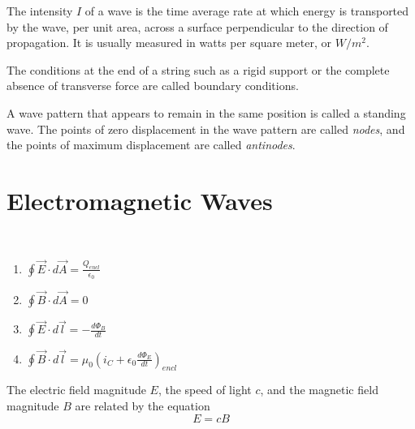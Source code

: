 \documentclass[nobib,notoc]{tufte-handout}
\begin{document}
\begin{defi}[Intensity]
	The intensity \(I\) of a wave is the time average rate at which energy is transported by the wave, per unit area, across a surface perpendicular to the direction of propagation. It is usually measured in watts per square meter, or \(W/m^2\).
\end{defi}
\begin{defi}
	The conditions at the end of a string such as a rigid support or the complete absence of transverse force are called boundary conditions.
\end{defi}
\begin{defi}
	A wave pattern that appears to remain in the same position is called a standing wave. The points of zero displacement in the wave pattern are called \emph{nodes}, and the points of maximum displacement are called \emph{antinodes}.
\end{defi}
\section{Electromagnetic Waves}
\begin{defi}
	\,
	\begin{enumerate}[label=\phantom{-}]
		\item \(\oint \vec{E}\cdot d\vec{A}=\frac{Q_{encl}}{\epsilon_0}\)
		\item \(\oint \vec{B}\cdot d\vec{A}=0\)
		\item \(\oint \vec{E}\cdot d\vec{l}=-\frac{d\Phi_B}{dt}\)
		\item \(\oint \vec{B}\cdot d\vec{l}=\mu_0(i_C+\epsilon_0\frac{d\Phi_E}{dt})_{encl}\)
	\end{enumerate}
\end{defi}
\begin{defi}
	The electric field magnitude \(E\), the speed of light \(c\), and the magnetic field magnitude \(B\) are related by the equation
	\begin{equation*}
		E=cB
	\end{equation*}
\end{defi}
\end{document}
